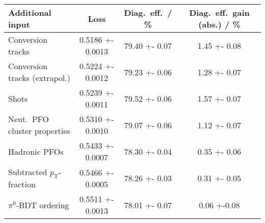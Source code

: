 \begin{tabular}{p{5cm}S[table-format=1.4(4)]S[table-format=2.2(2)]S[table-format=1.2(2)]}
  \toprule
  {Additional input} & {Loss} & {Diag.\ eff.\ / \si{\percent}} & {Diag.\ eff.\ gain (abs.) / \si{\percent}} \\
  \midrule
  Conversion tracks & 0.5186 +- 0.0013 & 79.40 +- 0.07 & 1.45 +- 0.08 \\
  Conversion tracks (extrapol.) & 0.5224 +- 0.0012 & 79.23 +- 0.06 & 1.28 +- 0.07 \\
  Shots & 0.5239 +- 0.0011 & 79.52 +- 0.06 &  1.57 +- 0.07 \\
  Neut.\ PFO cluster properties & 0.5310 +- 0.0010 & 79.07 +- 0.06 & 1.12 +- 0.07 \\
  Hadronic PFOs & 0.5433 +- 0.0007 & 78.30 +- 0.04 & 0.35 +- 0.06 \\
  Subtracted $p_\text{T}$-fraction & 0.5466 +- 0.0005 & 78.26 +- 0.03 & 0.31 +- 0.05 \\
  $\pi^0$-BDT ordering & 0.5511 +- 0.0013 & 78.01 +- 0.07 & 0.06 +-0.08 \\
  \bottomrule
\end{tabular}

